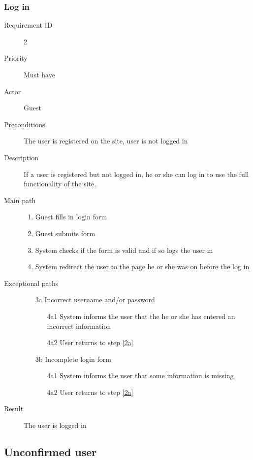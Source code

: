 		\subsubsection{Log in}
			\begin{description}
				\item[Requirement ID] 2
				\item[Priority] Must have
				\item[Actor] Guest
				\item[Preconditions] The user is registered on the site,
				user is not logged in
				\item[Description]
				If a user is registered but not logged in, he or she can
				log in to use the full functionality of the site.
				\item[Main path]
 					\begin{enumerate}
						\item \label{2a} Guest fills in login form
						\item Guest submits form
						\item System checks if the form is valid and if so logs
						the user in
						\item System redirect the user to the page he or she was on
							before the log in
					\end{enumerate}
				\item[Exceptional paths]
					\begin{enumerate}
						\item[3a] Incorrect username and/or password
							\begin{itemize}
								\item[4a1] System informs the user that the he or she has entered an incorrect information
								\item[4a2] User returns to step \ref{2a}
							\end{itemize}
						\item[3b] Incomplete login form
							\begin{itemize}
								\item[4a1] System informs the user that some information is missing
								\item[4a2] User returns to step \ref{2a}
							\end{itemize}
					\end{enumerate}
				\item[Result] The user is logged in
			\end{description}
	\subsection{Unconfirmed user}
